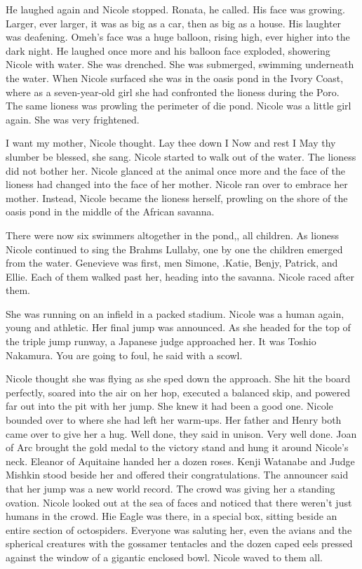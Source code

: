 \documentclass[]{article}
\begin{document}
{{He laughed again and Nicole stopped. Ronata, he called. His face was growing. Larger, ever larger, it was as big as a car, then as big as a house. His laughter was deafening. Omeh’s face was a huge balloon, rising high, ever higher into the dark night. He laughed once more and his balloon face exploded, showering Nicole with water. She was drenched. She was submerged, swimming underneath the water. When Nicole surfaced she was in the oasis pond in the Ivory Coast, where as a seven-year-old girl she had confronted the lioness during the Poro. The same lioness was prowling the perimeter of die pond. Nicole was a little girl again. She was very frightened.

I want my mother, Nicole thought. Lay thee down I Now and rest I May thy slumber be blessed, she sang. Nicole started to walk out of the water. The lioness did not bother her. Nicole glanced at the animal once more and the face of the lioness had changed into the face of her mother. Nicole ran over to embrace her mother. Instead, Nicole became the lioness herself, prowling on the shore of the oasis pond in the middle of the African savanna.

There were now six swimmers altogether in the pond,, all children. As lioness Nicole continued to sing the Brahms Lullaby, one by one the children emerged from the water. Genevieve was first, men Simone, .Katie, Benjy, Patrick, and Ellie. Each of them walked past her, heading into the savanna. Nicole raced after them.

She was running on an infield in a packed stadium. Nicole was a human again, young and athletic. Her final jump was announced. As she headed for the top of the triple jump runway, a Japanese judge approached her. It was Toshio Nakamura. You are going to foul, he said with a scowl.

Nicole thought she was flying as she sped down the approach. She hit the board perfectly, soared into the air on her hop, executed a balanced skip, and powered far out into the pit with her jump. She knew it had been a good one. Nicole bounded over to where she had left her warm-ups. Her father and Henry both came over to give her a hug. Well done, they said in unison. Very well done. Joan of Arc brought the gold medal to the victory stand and hung it around Nicole’s neck. Eleanor of Aquitaine handed her a dozen roses. Kenji Watanabe and Judge Mishkin stood beside her and offered their congratulations. The announcer said that her jump was a new world record. The crowd was giving her a standing ovation. Nicole looked out at the sea of faces and noticed that there weren’t just humans in the crowd. Hie Eagle was there, in a special box, sitting beside an entire section of octospiders. Everyone was saluting her, even the avians and the spherical creatures with the gossamer tentacles and the dozen caped eels pressed against the window of a gigantic enclosed bowl. Nicole waved to them all.

}}
\end{document}
